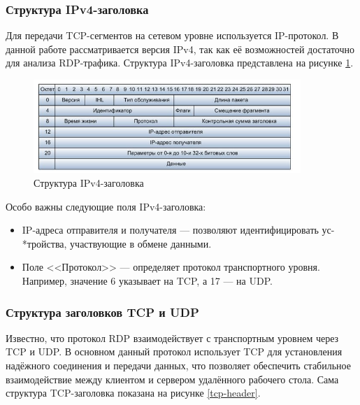 \documentclass[bachelor, och, coursework]{SCWorks}
\begin{document}
\subsubsection{Структура IPv4-заголовка}

Для передачи TCP-сегментов на сетевом уровне используется IP-протокол. В данной работе рассматривается версия IPv4, 
так как её возможностей достаточно для анализа RDP-трафика. Структура IPv4-заголовка представлена на рисунке \ref{ipv4-header}.

\begin{figure}[H]
  \centering
  \includegraphics[width=0.9\textwidth]{pics/ipv4-header.png}
  \caption{Структура IPv4-заголовка}
  \label{ipv4-header}
\end{figure}

Особо важны следующие поля IPv4-заголовка:

\begin{itemize}
  \item IP-адреса отправителя и получателя --- позволяют идентифицировать ус-\\*тройства, участвующие в обмене данными.
  \item Поле <<Протокол>> --- определяет протокол транспортного уровня. Например, значение 6 указывает на TCP, а 17 --- на UDP.
\end{itemize}

\subsubsection{Структура заголовков TCP и UDP}

Известно, что протокол RDP взаимодействует с транспортным уровнем через TCP и UDP.
В основном данный протокол использует TCP для установления надёжного соединения и передачи данных, что позволяет обеспечить стабильное взаимодействие 
между клиентом и сервером удалённого рабочего стола. Сама структура TCP-заголовка показана на рисунке \ref{tcp-header}.
\end{document}
